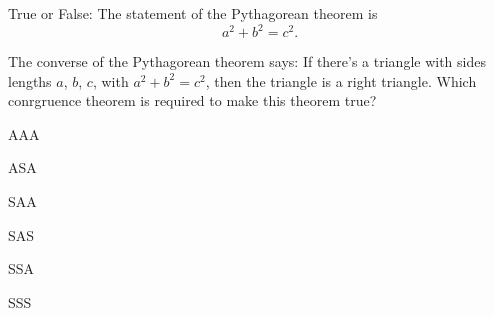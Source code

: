 \documentclass[nooutcomes,noauthor]{ximera}
\author{Bart Snapp}
\begin{document}
\maketitle





\begin{exercise}  
  True or False:
  The statement of the Pythagorean theorem is
  \[
  a^2 + b^2 = c^2.
  \]
\end{exercise}



\begin{exercise}
  The converse of the Pythagorean theorem says: If there's a triangle with sides lengths $a$, $b$, $c$, with $a^2+b^2=c^2$, then the triangle is a right triangle.
  Which conrgruence theorem is required to make this theorem true?
  \begin{enumerate}
    \begin{multicols}{2}
  \item AAA
  \item ASA
  \item SAA\break
  \item SAS
  \item SSA
  \item SSS
    \end{multicols}
  \end{enumerate}
\end{exercise}



\begin{exercise}
\end{exercise}



\begin{exercise}
\end{exercise}



\begin{exercise}
\end{exercise}




\end{document}
